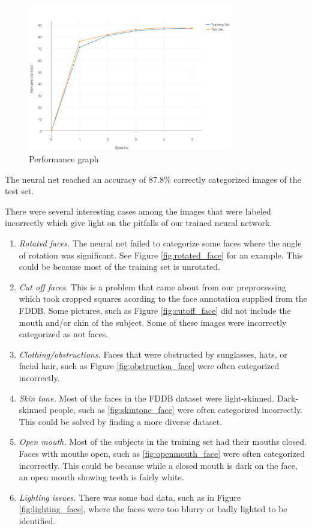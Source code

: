 \documentclass[11pt]{article}
\begin{document}
\begin{figure}[h]
    \centering
    \includegraphics[width=0.8\textwidth]{performance_graph.png}
    \caption{Performance graph}
    \label{fig:performance_graph}
\end{figure}
The neural net reached an accuracy of 87.8\% correctly categorized images of the test set.

There were several interesting cases among the images that were labeled incorrectly which give light on the pitfalls of our trained neural network.

 \begin{enumerate} 
 \item \textit{Rotated faces.} The neural net failed to categorize some faces where the angle of rotation was significant. See Figure \ref{fig:rotated_face} for an example. This could be because most of the training set is unrotated.
 \item \textit{Cut off faces. } This is a problem that came about from our preprocessing which took cropped squares acording to the face annotation supplied from the FDDB. Some pictures, such as Figure \ref{fig:cutoff_face} did not include the mouth and/or chin of the subject. Some of these images were incorrectly categorized as not faces.
 \item \textit{Clothing/obstructions. } Faces that were obstructed by sunglasses, hats, or facial hair, such as Figure \ref{fig:obstruction_face} were often categorized incorrectly.
 \item \textit{Skin tone.}  Most of the faces in the FDDB dataset were light-skinned. Dark-skinned people, such as \ref{fig:skintone_face} were often categorized incorrectly. This could be solved by finding a more diverse dataset.
 \item \textit{Open mouth. } Most of the subjects in the training set had their mouths closed. Faces with mouths open, such as \ref{fig:openmouth_face} were often categorized incorrectly. This could be because while a closed mouth is dark on the face, an open mouth showing teeth is fairly white.
 \item \textit{Lighting issues. } There was some bad data, such as in Figure \ref{fig:lighting_face}, where the faces were too blurry or badly lighted to be identified.
 \end{enumerate}
 
\end{document}
